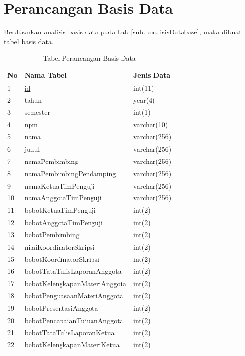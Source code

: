 	\section{Perancangan Basis Data}
	\label{sec: perancanganDatabase}
	
	Berdasarkan analisis basis data pada bab \ref{sub: analisisDatabase}, maka dibuat tabel basis data.
	\begin{table}[H]
	\centering
	\caption{Tabel Perancangan Basis Data}
	\begin{tabular}{| m{0.75cm} | m{7cm} | m{3cm} |}
		\hline
		No & Nama Tabel & Jenis Data\\
		\hline
		1 & \underline{id} & int(11)\\
		\hline
		2 & tahun & year(4)\\
		\hline
		3 & semester & int(1)\\
		\hline
		4 & npm & varchar(10)\\
		\hline
		5 & nama & varchar(256)\\
		\hline
		6 & judul & varchar(256)\\
		\hline
		7 & namaPembimbing & varchar(256)\\
		\hline
		8 & namaPembimbingPendamping & varchar(256)\\
		\hline
		9 & namaKetuaTimPenguji & varchar(256)\\
		\hline
		10 & namaAnggotaTimPenguji & varchar(256)\\
		\hline
		11 & bobotKetuaTimPenguji & int(2)\\
		\hline
		12 & bobotAnggotaTimPenguji & int(2)\\
		\hline
		13 & bobotPembimbing & int(2)\\
		\hline
		14 & nilaiKoordinatorSkripsi & int(2)\\
		\hline
		15 & bobotKoordinatorSkripsi & int(2)\\
		\hline
		16 & bobotTataTulisLaporanAnggota & int(2)\\
		\hline
		17 & bobotKelengkapanMateriAnggota & int(2)\\
		\hline
		18 & bobotPenguasaanMateriAnggota & int(2)\\
		\hline
		19 & bobotPresentasiAnggota & int(2)\\
		\hline
		20 & bobotPencapaianTujuanAnggota & int(2)\\
		\hline
		21 & bobotTataTulisLaporanKetua & int(2)\\
		\hline
		22 & bobotKelengkapanMateriKetua & int(2)\\
		\hline

\end{tabular}
\end{table}

